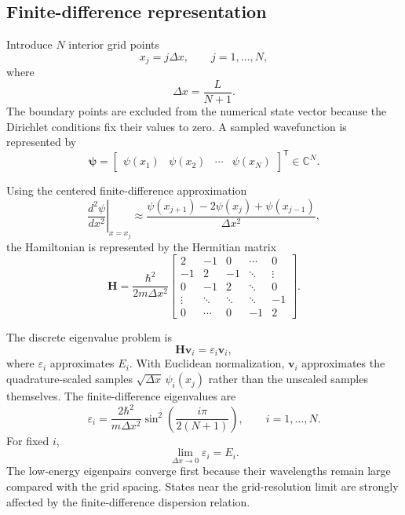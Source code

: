 \subsection{Finite-difference representation}

Introduce $N$ interior grid points
\begin{equation}
    x_j=j\Delta x,
    \qquad
    j=1,\ldots,N,
\end{equation}
where
\begin{equation}
    \Delta x=\frac{L}{N+1}.
\end{equation}
The boundary points are excluded from the numerical state vector because the
Dirichlet conditions fix their values to zero. A sampled wavefunction is
represented by
\begin{equation}
    \boldsymbol\psi
    =
    \begin{bmatrix}
        \psi(x_1) & \psi(x_2) & \cdots & \psi(x_N)
    \end{bmatrix}^{\mathsf T}
    \in\mathbb C^N.
\end{equation}

Using the centered finite-difference approximation
\begin{equation}
    \left.
        \frac{d^2\psi}{dx^2}
    \right|_{x=x_j}
    \approx
    \frac{
        \psi(x_{j+1})-2\psi(x_j)+\psi(x_{j-1})
    }{\Delta x^2},
\end{equation}
the Hamiltonian is represented by the Hermitian matrix
\begin{equation}
    \mathbf H
    =
    \frac{\hbar^2}{2m\Delta x^2}
    \begin{bmatrix}
        2  & -1 & 0  & \cdots & 0 \\
        -1 & 2  & -1 & \ddots & \vdots \\
        0  & -1 & 2  & \ddots & 0 \\
        \vdots & \ddots & \ddots & \ddots & -1 \\
        0 & \cdots & 0 & -1 & 2
    \end{bmatrix}.
\end{equation}

The discrete eigenvalue problem is
\begin{equation}
    \mathbf H\mathbf v_i
    =
    \varepsilon_i\mathbf v_i,
\end{equation}
where $\varepsilon_i$ approximates $E_i$. With Euclidean normalization,
$\mathbf v_i$ approximates the quadrature-scaled samples
$\sqrt{\Delta x}\,\psi_i(x_j)$ rather than the unscaled samples themselves.
The finite-difference eigenvalues are
\begin{equation}
    \varepsilon_i
    =
    \frac{2\hbar^2}{m\Delta x^2}
    \sin^2\left(
        \frac{i\pi}{2(N+1)}
    \right),
    \qquad i=1,\ldots,N.
\end{equation}
For fixed $i$,
\begin{equation}
    \lim_{\Delta x\rightarrow 0}\varepsilon_i
    =
    E_i.
\end{equation}
The low-energy eigenpairs converge first because their wavelengths remain
large compared with the grid spacing. States near the grid-resolution limit
are strongly affected by the finite-difference dispersion relation.

